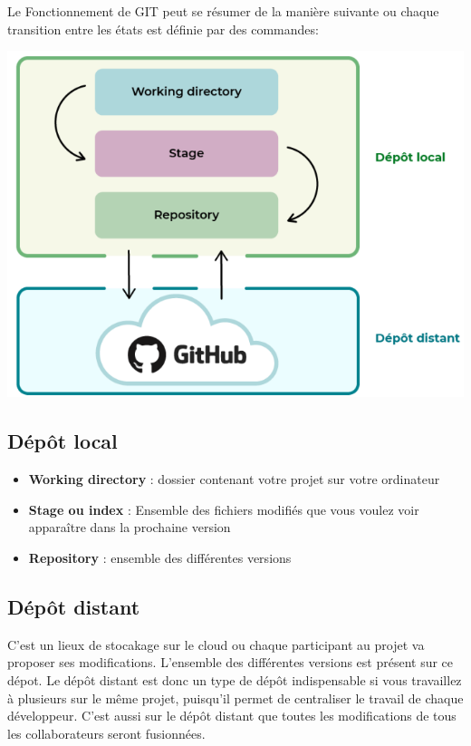 \documentclass[french, 12pt]{article}%
\newcommand{\itemE}{\item[$\bullet$]}
\begin{document}
Le Fonctionnement de GIT peut se résumer de la manière suivante ou chaque transition entre les états est définie par des commandes: 

\begin{center}
\includegraphics[scale=0.5]{./ressource/fctTGit}
\end{center}

\subsection{Dépôt local }

\begin{itemize}
\itemE \textbf{Working directory} : dossier contenant votre projet sur votre ordinateur
\itemE \textbf{Stage ou index} : Ensemble des fichiers modifiés que vous voulez voir apparaître dans la prochaine version
\itemE \textbf{Repository} : ensemble des différentes versions
\end{itemize}

\subsection{Dépôt distant}

C'est un lieux de stocakage sur le cloud ou chaque participant au projet va proposer ses modifications. L'ensemble des différentes versions est présent sur ce dépot. 
Le dépôt distant est donc un type de dépôt indispensable si vous travaillez à plusieurs sur le même projet, puisqu’il permet de centraliser le travail de chaque développeur. C’est aussi sur le dépôt distant que toutes les modifications de tous les collaborateurs seront fusionnées.
\end{document}

